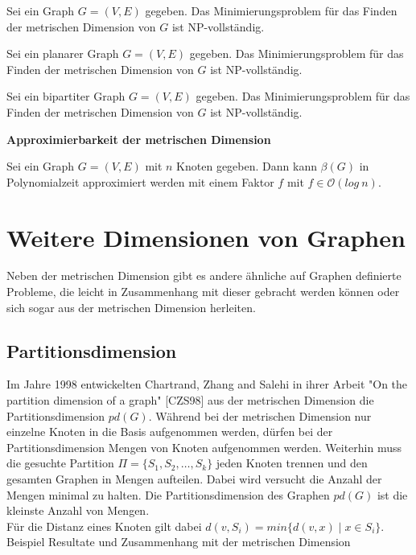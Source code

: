 \begin{lem}\cite{onthecomplexity}
Sei ein Graph $G=(V,E)$ gegeben. Das Minimierungsproblem für das Finden der metrischen Dimension von $G$ ist NP-vollständig.
\end{lem}
\begin{lem}\cite{onthecomplexity}
Sei ein planarer Graph $G=(V,E)$ gegeben. Das Minimierungsproblem für das Finden der metrischen Dimension von $G$ ist NP-vollständig.
\end{lem}
\begin{lem}\cite{anefficientrepresentationofbenesnetworksanditsapplications}
Sei ein bipartiter Graph $G=(V,E)$ gegeben. Das Minimierungsproblem für das Finden der metrischen Dimension von $G$ ist NP-vollständig.
\end{lem}
\textbf{Approximierbarkeit der metrischen Dimension}
\begin{lem}\cite{landmarks}
Sei ein Graph $G=(V,E)$ mit $n$ Knoten gegeben. Dann kann $\beta(G)$ in Polynomialzeit approximiert werden mit einem Faktor $f$ mit $f \in \mathcal{O}(log\:n)$.
\end{lem}
\newpage
\section{Weitere Dimensionen von Graphen}
Neben der metrischen Dimension gibt es andere ähnliche auf Graphen definierte Probleme, die leicht in Zusammenhang mit dieser gebracht werden können oder sich sogar aus der metrischen Dimension herleiten.
\subsection{Partitionsdimension}
Im Jahre 1998 entwickelten Chartrand, Zhang and Salehi in ihrer Arbeit "On the partition dimension of a graph" [CZS98] aus der metrischen Dimension die Partitionsdimension $pd(G)$. Während bei der metrischen Dimension nur einzelne Knoten in die Basis aufgenommen werden, dürfen bei der Partitionsdimension Mengen von Knoten aufgenommen werden. Weiterhin muss die gesuchte Partition $\Pi = \{S_1, S_2, \ldots, S_k\}$ jeden Knoten trennen und den gesamten Graphen in Mengen aufteilen. Dabei wird versucht die Anzahl der Mengen minimal zu halten. Die Partitionsdimension des Graphen $pd(G)$ ist die kleinste Anzahl von Mengen.\\
Für die Distanz eines Knoten gilt dabei $d(v,S_i)=min\{d(v,x) \mid x\in S_i\}$.\newline
Beispiel\newline
Resultate und Zusammenhang mit der metrischen Dimension\newline
